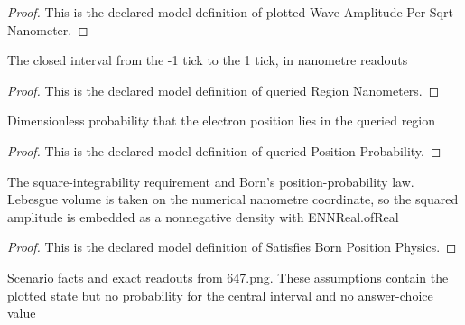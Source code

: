 \begin{proof}
  This is the declared model definition of plotted Wave Amplitude Per Sqrt Nanometer.
\end{proof}
\begin{definition}
  \label{def:physics:phyx-mini-0647:phyxminiproblems-problemphyxmini0647-queriedregionnanometers}
  The closed interval from the -1 tick to the 1 tick, in nanometre readouts
\end{definition}
\begin{proof}
  This is the declared model definition of queried Region Nanometers.
\end{proof}
\begin{definition}
  \label{def:physics:phyx-mini-0647:phyxminiproblems-problemphyxmini0647-queriedpositionprobability}
  Dimensionless probability that the electron position lies in the queried region
\end{definition}
\begin{proof}
  This is the declared model definition of queried Position Probability.
\end{proof}
\begin{definition}
  \label{def:physics:phyx-mini-0647:phyxminiproblems-problemphyxmini0647-satisfiesbornpositionphysics}
  The square-integrability requirement and Born's position-probability law. Lebesgue volume is taken on the numerical nanometre coordinate, so the squared amplitude is embedded as a nonnegative density with ENNReal.ofReal
\end{definition}
\begin{proof}
  This is the declared model definition of Satisfies Born Position Physics.
\end{proof}
\begin{definition}
  \label{def:physics:phyx-mini-0647:phyxminiproblems-problemphyxmini0647-matchesproblemstatementandfigure}
  Scenario facts and exact readouts from 647.png. These assumptions contain the plotted state but no probability for the central interval and no answer-choice value
\end{definition}
